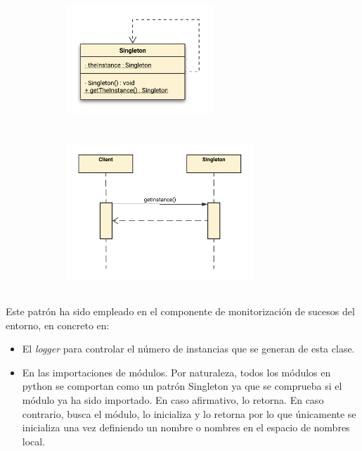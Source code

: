 \documentclass[12pt,a4paper, twoside]{report}
\begin{document}
	\begin{figure}[h]		
		\caption{Diagrama de clases y de secuencia del patrón de diseño creacional Singleton.}
 		\begin{subfigure}{0.5\textwidth}
 			\hbox{
 				\hspace{1cm}
 				\includegraphics[width=5.5cm, height=4.5cm]{Images/design/singleton_uml.png} 
 			}
		\end{subfigure}
		\begin{subfigure}{0.5\textwidth}
			\hbox{
 				\hspace{2cm}
				\includegraphics[width=7cm, height=6cm]{Images/design/singleton_secuencia}
			}
		\end{subfigure}
		\label{fig:design_singleton}
	\end{figure}
 	
	Este patrón ha sido empleado en el componente de monitorización de sucesos del entorno, en concreto en:

	\begin{itemize}
		\item El \textit{logger} para controlar el número de instancias que se generan de esta clase.
		\item En las importaciones de módulos. Por naturaleza, todos los módulos en \gls{python} se comportan como un patrón Singleton ya que se comprueba si el módulo ya ha sido importado. En caso afirmativo, lo retorna. En caso contrario, busca el módulo, lo inicializa y lo retorna por lo que únicamente se inicializa una vez definiendo un nombre o nombres en el espacio de nombres local.
	\end{itemize}
		
\end{document}
